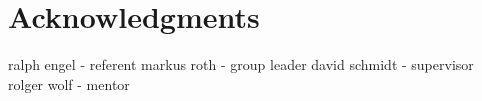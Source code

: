 \chapter{Acknowledgments}
\label{chap:acknowledgements}

ralph engel - referent
markus roth - group leader
david schmidt - supervisor
rolger wolf - mentor